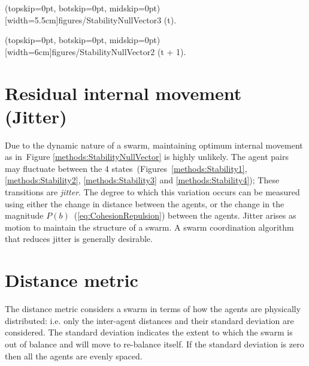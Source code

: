\documentclass{ieeeaccess}
\begin{document}
\Figure[t!](topskip=0pt, botskip=0pt, midskip=0pt)[width=5.5cm]{figures/StabilityNullVector3}
{(t).\label{concave:VoidPerimeter1}}


\Figure[t!](topskip=0pt, botskip=0pt, midskip=0pt)[width=6cm]{figures/StabilityNullVector2}
{(t + 1).\label{concave:VoidPerimeter2}}


\section{Residual internal movement (Jitter)}\label{metric:Jitter}
Due to the dynamic nature of a swarm, maintaining optimum internal movement as in~Figure \ref{methods:StabilityNullVector} is highly unlikely. The agent pairs may fluctuate between the 4 states~(Figures~\ref{methods:Stability1}, \ref{methods:Stability2}, \ref{methods:Stability3} and \ref{methods:Stability4}); These transitions are \emph{jitter}. The degree to which this variation occurs can be measured using either the change in distance between the agents, or the change in the magnitude $P(b)$~(\ref{eq:CohesionRepulsion}) between the agents. Jitter arises as motion to maintain the structure of a swarm. A swarm coordination algorithm that reduces jitter is generally desirable. 

\section{Distance metric\label{section:DistanceDynamics}}
The distance metric considers a swarm in terms of how the agents are physically distributed: i.e. only the inter-agent distances and their standard deviation are considered. The standard deviation indicates the extent to which the swarm is out of balance and will move to re-balance itself. If the standard deviation is zero then all the agents are evenly spaced. 
\end{document}
